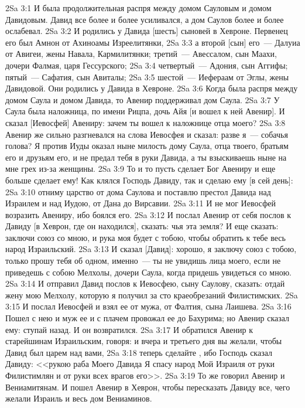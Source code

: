 \vs 2Sa 3:1 И была продолжительная распря между домом Сауловым и домом Давидовым. Давид все более и более усиливался, а дом Саулов более и более ослабевал.
\vs 2Sa 3:2 И родились у Давида [шесть] сыновей в Хевроне. Первенец его был Амнон от Ахиноамы Изреелитянки,
\vs 2Sa 3:3 а второй [сын] его~--- Далуиа от Авигеи,  жены Навала, Кармилитянки; третий~--- Авессалом, сын Маахи, дочери Фалмая, царя Гессурского;
\vs 2Sa 3:4 четвертый~--- Адония, сын Аггифы; пятый~--- Сафатия, сын Авиталы;
\vs 2Sa 3:5 шестой~--- Иефераам от Эглы, жены Давидовой. Они родились у Давида в Хевроне.
\rsbpar\vs 2Sa 3:6 Когда была распря между домом Саула и домом Давида, то Авенир поддерживал дом Саула.
\vs 2Sa 3:7 У Саула была наложница, по имени Рицпа, дочь Айя [и вошел к ней Авенир]. И сказал [Иевосфей] Авениру: зачем ты вошел к наложнице отца моего?
\vs 2Sa 3:8 Авенир же сильно разгневался на слова Иевосфея и сказал: разве я~--- собачья голова? Я против Иуды оказал ныне милость дому Саула, отца твоего, братьям его и друзьям его, и не предал тебя в руки Давида, а ты взыскиваешь ныне на мне грех из-за женщины.
\vs 2Sa 3:9 То и то пусть сделает Бог Авениру и еще больше сделает ему! Как клялся Господь Давиду, так и сделаю ему [в сей день]:
\vs 2Sa 3:10 отниму царство от дома Саулова и поставлю престол Давида над Израилем и над Иудою, от Дана до Вирсавии.
\vs 2Sa 3:11 И не мог Иевосфей возразить Авениру, ибо боялся его.
\vs 2Sa 3:12 И послал Авенир от себя послов к Давиду [в Хеврон, где он находился], сказать: чья эта земля? И еще сказать: заключи союз со мною, и рука моя будет с тобою, чтобы обратить к тебе весь народ Израильский.
\vs 2Sa 3:13 И сказал [Давид]: хорошо, я заключу союз с тобою, только прошу тебя об одном, именно~--- ты не увидишь лица моего, если не приведешь с собою Мелхолы, дочери Саула, когда придешь увидеться со мною.
\vs 2Sa 3:14 И отправил Давид послов к Иевосфею, сыну Саулову, сказать: отдай жену мою Мелхолу, которую я получил за сто краеобрезаний Филистимских.
\vs 2Sa 3:15 И послал Иевосфей и взял ее от мужа, от Фалтия, сына Лаишева.
\vs 2Sa 3:16 Пошел с нею и муж ее и с плачем провожал ее до Бахурима; но Авенир сказал ему: ступай назад. И он возвратился.
\vs 2Sa 3:17 И обратился Авенир к старейшинам Израильским, говоря: и вчера и третьего дня вы желали, чтобы Давид был царем над вами,
\vs 2Sa 3:18 теперь сделайте , ибо Господь сказал Давиду: <<рукою раба Моего Давида Я спасу народ Мой Израиля от руки Филистимлян и от руки всех врагов его>>.
\vs 2Sa 3:19 То же говорил Авенир и Вениамитянам. И пошел Авенир в Хеврон, чтобы пересказать Давиду все, чего желали Израиль и весь дом Вениаминов.
